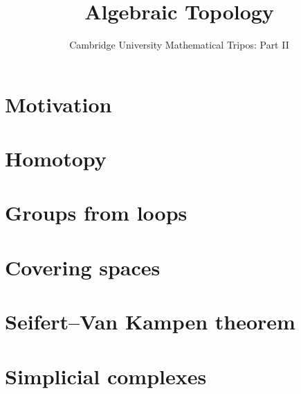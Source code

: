 \documentclass{article}
\title{Algebraic Topology}
\author{Cambridge University Mathematical Tripos: Part II}
\begin{document}
\maketitle

\tableofcontentsnewpage{}

\section{Motivation}

\section{Homotopy}

\section{Groups from loops}

\section{Covering spaces}

\section{Seifert--Van Kampen theorem}

\section{Simplicial complexes}

\end{document}
